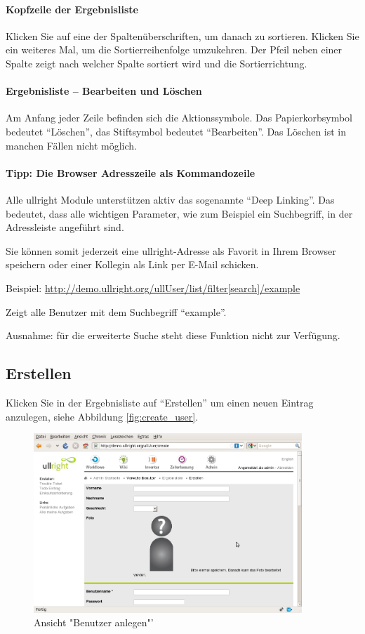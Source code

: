\documentclass[article, a4paper, oneside, 11pt]{memoir}
\begin{document}
\paragraph{Kopfzeile der Ergebnisliste}
Klicken Sie auf eine der Spaltenüberschriften, um danach zu sortieren. Klicken Sie ein weiteres Mal, um die Sortierreihenfolge umzukehren. Der Pfeil neben einer Spalte zeigt nach welcher Spalte sortiert wird und die Sortierrichtung.

\paragraph{Ergebnisliste -- Bearbeiten und Löschen}
Am Anfang jeder Zeile befinden sich die Aktionssymbole. Das Papierkorbsymbol bedeutet "`Löschen"', das Stiftsymbol bedeutet "`Bearbeiten"'. Das Löschen ist in manchen Fällen nicht möglich.

\paragraph{Tipp: Die Browser Adresszeile als Kommandozeile}
Alle ullright Module unterstützen aktiv das sogenannte "`Deep Linking"'. Das bedeutet, dass alle wichtigen Parameter, wie zum Beispiel ein Suchbegriff, in der Adressleiste angeführt sind.

Sie können somit jederzeit eine ullright-Adresse als Favorit in Ihrem Browser speichern oder einer Kollegin als Link per E-Mail schicken.

Beispiel: \url{http://demo.ullright.org/ullUser/list/filter[search]/example}

Zeigt alle Benutzer mit dem Suchbegriff "`example"'.

Ausnahme: für die erweiterte Suche steht diese Funktion nicht zur Verfügung.

\subsection{Erstellen}
Klicken Sie in der Ergebnisliste auf "`Erstellen"' um einen neuen Eintrag anzulegen, siehe Abbildung \vref{fig:create_user}.

\begin{figure}[htp]
\centering
\includegraphics[width=0.9\textwidth]{figures/ullrightgermanexport-img10.png}
\caption{Ansicht "Benutzer anlegen"'}
\label{fig:create_user}
\end{figure}
\end{document}
